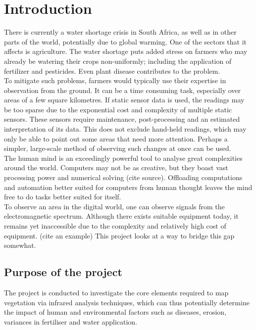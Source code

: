 \chapter{Introduction}


There is currently a water shortage crisis in South Africa, as well as in other parts of the world, potentially due to global warming. One of the sectors that it affects is agriculture. The water shortage puts added stress on farmers who may already be watering their crops non-uniformly; including the application of fertilizer and pesticides. Even plant disease contributes to the problem.\\

To mitigate such problems, farmers would typically use their expertise in observation from the ground. It can be a time consuming task, especially over areas of a few square kilometres. If static sensor data is used, the readings may be too sparse due to the exponential cost and complexity of multiple static sensors. These sensors require maintenance, post-processing and an estimated interpretation of its data. This does not exclude hand-held readings, which may only be able to point out some areas that need more attention. Perhaps a simpler, large-scale method of observing such changes at once can be used.\\

The human mind is an exceedingly powerful tool to analyse great complexities around the world. Computers may not be as creative, but they boast vast processing power and numerical solving (cite source). Offloading computations and automation better suited for computers from human thought leaves the mind free to do tasks better suited for itself.\\

To observe an area in the digital world, one can observe signals from the electromagnetic spectrum. Although there exists suitable equipment today, it remains yet inaccessible due to the complexity and relatively high cost of equipment. (cite an example) This project looks at a way to bridge this gap somewhat.

\section{Purpose of the project}

The project is conducted to investigate the core elements required to map vegetation via infrared analysis techniques, which can thus potentially determine the impact of human and environmental factors such as diseases, erosion, variances in fertiliser and water application.\\

